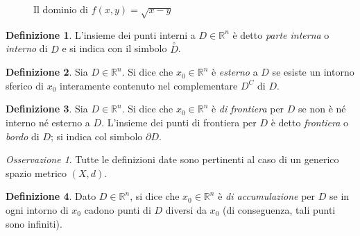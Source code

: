 \documentclass[a4paper]{book}
\numberwithin{equation}{section}
\theoremstyle{plain}
\theoremstyle{definition}
\newtheorem{defn}{Definizione}[section]
\theoremstyle{remark}
\newtheorem{oss}{Osservazione}[section]
\theoremstyle{example}
\begin{document}
\begin{figure}[ht]
	\centering
	\caption{Il dominio di $f(x, y) = \sqrt{x-y}$}
	\label{fig:esinterni}
\end{figure}


\begin{defn}
	L'insieme dei punti interni a $D\in \mathbb{R}^n$ è detto \emph{parte interna} o \emph{interno} di $D$ e si indica con il simbolo $\overset{\circ}{D}$.
\end{defn}

\begin{defn}
	Sia $D\in \mathbb{R}^n$. Si dice che $x_0 \in \mathbb{R}^n$ è \emph{esterno} a $D$ se esiste un intorno sferico di $x_0$ interamente contenuto nel complementare $D^C$ di $D$.
\end{defn}

\begin{defn}
	Sia $D\in \mathbb{R}^n$. Si dice che $x_0 \in \mathbb{R}^n$ è \emph{di frontiera} per $D$ se non è né interno né esterno a $D$. L'insieme dei punti di frontiera per $D$ è detto \emph{frontiera} o \emph{bordo} di $D$; si indica col simbolo $\partial D$.
\end{defn}

\begin{oss}
	Tutte le definizioni date sono pertinenti al caso di un generico spazio metrico $(X, d)$.
\end{oss}

\begin{defn}
	Dato $D \in \mathbb{R}^n$, si dice che $x_0 \in \mathbb{R}^n$ è \emph{di accumulazione} per $D$ se in ogni intorno di $x_0$ cadono punti di $D$ diversi da $x_0$ (di conseguenza, tali punti sono infiniti).
\end{defn}
\end{document}
